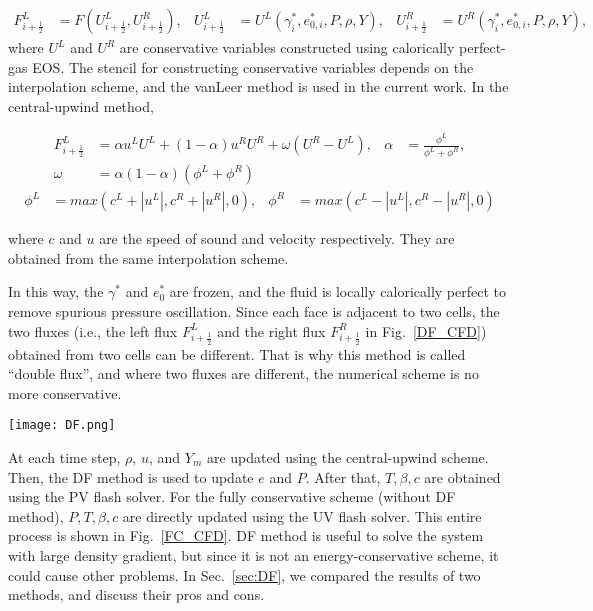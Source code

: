 \begin{align}
F^L_{i+\frac{1}{2}}& = F\left(U^L_{i+\frac{1}{2}},U^R_{i+\frac{1}{2}}\right),&
U^L_{i+\frac{1}{2}}& = U^L\left(\gamma^*_i,e_{0,i}^*,P,\rho ,Y\right),&
U^R_{i+\frac{1}{2}}& = U^R\left(\gamma^*_i,e_{0,i}^*,P,\rho ,Y\right),
\end{align}
where $U^L$ and $U^R$ are conservative variables constructed using calorically perfect-gas EOS. The stencil for constructing conservative variables depends on the interpolation scheme, and the vanLeer method \cite{van1974towards} is used in the current work. In the central-upwind method,

\begin{align} F^L_{i+\frac{1}{2}} &= \alpha u^LU^L + \left(1-\alpha\right)u^R U^R + \omega \left(U^R-U^L\right),&
\alpha &= \frac{\phi^L}{\phi^L +\phi^R},\\
 \omega &= \alpha \left(1-\alpha\right) \left(\phi^L+\phi^R\right)
 \end{align}
\begin{align} \phi^L& = max\left(c^L+|u^L|,c^R + |u^R|,0\right),&\phi^R &= max\left(c^L-|u^L|,c^R - |u^R|,0\right)
\end{align}

where $c$ and $u$ are the speed of sound and velocity respectively. They are obtained from the same interpolation scheme.


In this way, the $\gamma^*$ and $e_0^*$ are frozen, and the fluid is locally calorically perfect to remove spurious pressure oscillation. 
Since each face is adjacent to two cells, the two fluxes (i.e., the left flux $F^L_{i+\frac{1}{2}}$ and the right flux $F^R_{i+\frac{1}{2}}$ in Fig.~\ref{DF_CFD}) obtained from two cells can be different. That is why this method is called ``double flux'', and where two fluxes are different, the numerical scheme is no more conservative. 
\begin{figure*}[htbp]
\centering
\texttt{[image: DF.png]}
\caption{Schematic of the double flux (DF) method in a one-dimensional mesh.}
\label{DF_CFD} 
\end{figure*}

At each time step, $\rho$, $u$, and $Y_m$ are updated using the central-upwind scheme. Then, the DF method is used to update $e$ and $P$. After that, $T,\beta,c$ are obtained using the PV flash solver. For the fully conservative scheme (without DF method), $P,T,\beta,c$ are directly updated using the UV flash solver. This entire process is shown in Fig.~\ref{FC_CFD}. DF method is useful to solve the system with large density gradient, but since it is not an energy-conservative scheme, it could cause other problems. In Sec.~\ref{sec:DF}, we compared the results of two methods, and discuss their pros and cons.

